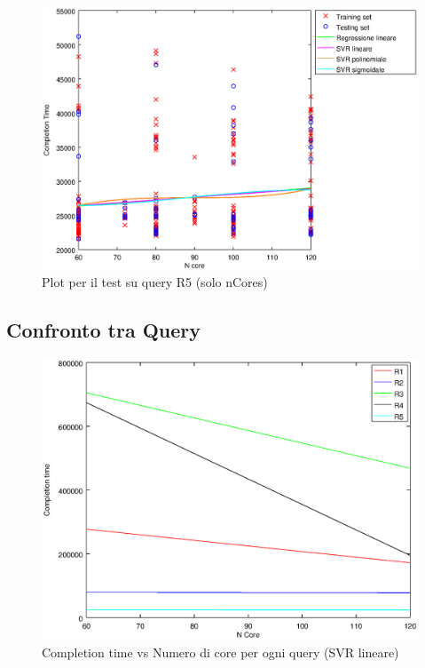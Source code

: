 \documentclass[a4paper,11pt]{article}
\begin{document}
\begin {figure}[hbtp]
\centering
\includegraphics[width=\textwidth]{output/R5_SOLO_CORE/plot_R5_-.eps}
\caption {Plot per il test su query R5 
(solo nCores)}
\end {figure}

\newpage
\subsection{Confronto tra Query}

\begin {figure}[hbtp]
\centering
\includegraphics[width=\textwidth]{output/QUERY_COMP_CORE/SVRlineare/plot.eps}
\caption {Completion time vs Numero di core per ogni query (SVR lineare)}
\end {figure}
\end{document}
